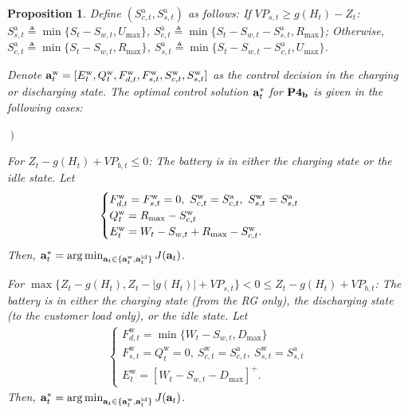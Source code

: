 \documentclass[journal]{IEEEtran}
\def\abf{{\bf a}}
\def\w{\textrm{w}}
\newtheorem{proposition}{Proposition}
\begin{document}
\begin{proposition}\label{prop0}
 Define $(S_{c,t}^\text{a},S_{s,t}^\text{a})$  as follows:
 If $VP_{s,t}\ge {g(H_t)-Z_t}$: $S^\text{a}_{s,t}\triangleq \min\{S_t-S_{w,t},U_{\max}\}$,  $S^\text{a}_{c,t}\triangleq\min\{S_t-S_{w,t}-S^\text{a}_{s,t},R_{\max}\}$;  Otherwise, $S^\text{a}_{c,t}\triangleq\min\{S_t-S_{w,t},R_{\max}\}$,  $S^\text{a}_{s,t}\triangleq\min\{S_t-S_{w,t}-S^\text{a}_{c,t},U_{\max}\}$.

Denote $\abf_t^\w=[E_t^\w,Q_t^\w,F_{d,t}^\w,F_{s,t}^\w,S_{c,t}^\w,S_{s,t}^\w]$ as the control decision in the charging or discharging state.  The optimal control solution $\abf^*_t$ for $\bf \text{\bf P4}_b$ is given in the following cases:
\begin{list}{{\it {}$\left.\right)$~}}
{
\setlength\leftmargin{1.5em}
\setlength{}
\setlength{}
\setlength\itemsep{.5em}
}

\item {\it For $Z_t-g(H_t)+VP_{b,t}\leq 0$}: The battery is in either the charging state or the idle state. Let
    \begin{align}\label{case a}
        \hspace*{-0.5em}\begin{cases}
        F^\w_{d,t}=F^\w_{s,t}=0,\ S^\w_{c,t}=S^\text{a}_{c,t},\ S^\w_{s,t}=S^\text{a}_{s,t}\\
        Q^\w_t=R_{\max}-S^\w_{c,t} \\
        E^\w_t=W_t-S_{w,t}+R_{\max}-S^\w_{c,t}.
        \end{cases}
  \end{align}
Then, $\abf^*_t=\arg\min_{\abf_t\in\{\abf_t^\w,\abf_t^\textrm{id}\}} J(\abf_t)$.



\item{\it For $\max\{Z_t-g(H_t),Z_t-|g(H_t)|+VP_{s,t}\}<0\leq Z_t-g(H_t)+VP_{b,t}$}: The battery is in either the charging state (from the RG only), the discharging state (to the customer load only), or the idle state. Let
  \begin{align}\label{case c}
      \begin{cases}
      F^\w_{d,t}=\min\{W_t-S_{w,t},D_{\max}\}\\
      F^\w_{s,t}=Q^\w_t=0,\ S^\w_{c,t}=S^\text{a}_{c,t},\ S^\w_{s,t}=S^\text{a}_{s,t}\\
      E^\w_t=[W_t-S_{w,t}-D_{\max}]^+.
      \end{cases}
  \end{align}
Then, $\abf^*_t=\arg\min_{\abf_t\in\{\abf_t^\w,\abf_t^\textrm{id}\}} J(\abf_t)$.


\end{list}
\end{proposition}
\end{document}
